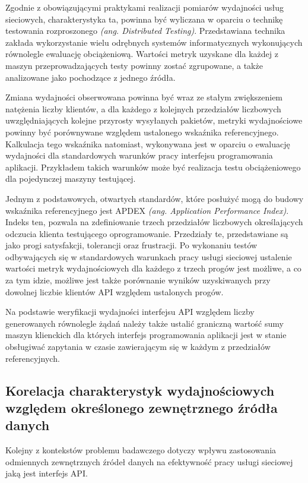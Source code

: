 Zgodnie z obowiązującymi praktykami realizacji pomiarów wydajności usług sieciowych, charakterystyka ta, powinna być wyliczana w oparciu o technikę testowania rozproszonego \textit{(ang. Distributed Testing)}. Przedstawiana technika zakłada wykorzystanie wielu odrębnych systemów informatycznych wykonujących równolegle ewaluację obciążeniową. Wartości metryk uzyskane dla każdej z maszyn przeprowadzających testy powinny zostać zgrupowane, a także analizowane jako pochodzące z jednego źródła.

Zmiana wydajności obserwowana powinna być wraz ze stałym zwiększeniem natężenia liczby klientów, a dla każdego z kolejnych przedziałów liczbowych uwzględniających kolejne przyrosty wysyłanych pakietów, metryki wydajnościowe powinny być porównywane względem ustalonego wskaźnika referencyjnego. Kalkulacja tego wskaźnika natomiast, wykonywana jest w oparciu o ewaluację wydajności dla standardowych warunków pracy interfejsu programowania aplikacji. Przykładem takich warunków może być realizacja testu obciążeniowego dla pojedynczej maszyny testującej.

Jednym z podstawowych, otwartych standardów, które posłużyć mogą do budowy wskaźnika referencyjnego jest APDEX \textit{(ang. Application Performance Index)}. Indeks ten, pozwala na zdefiniowanie trzech przedziałów liczbowych określających odczucia klienta testującego oprogramowanie. Przedziały te, przedstawiane są jako progi satysfakcji, tolerancji oraz frustracji. Po wykonaniu testów odbywających się w standardowych warunkach pracy usługi sieciowej ustalenie wartości metryk wydajnościowych dla każdego z trzech progów jest możliwe, a co za tym idzie, możliwe jest także porównanie wyników uzyskiwanych przy dowolnej liczbie klientów API względem ustalonych progów.

Na podstawie weryfikacji wydajności interfejsu API względem liczby generowanych równolegle żądań należy także ustalić graniczną wartość sumy maszyn klienckich dla których interfejs programowania aplikacji jest w stanie obsługiwać zapytania w czasie zawierającym się w każdym z przedziałów referencyjnych. 
\subsection*{Korelacja charakterystyk wydajnościowych względem określonego zewnętrznego źródła danych}
Kolejny z kontekstów problemu badawczego dotyczy wpływu zastosowania odmiennych zewnętrznych źródeł danych na efektywność pracy usługi sieciowej jaką jest interfejs API.

